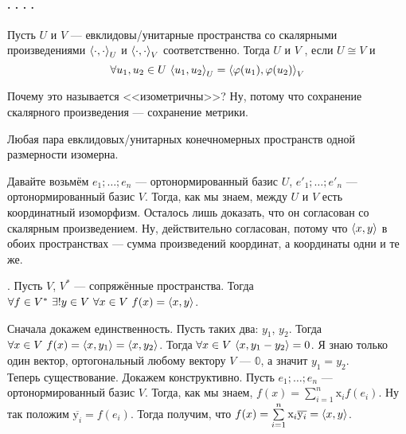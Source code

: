 \documentclass{article}
\begin{document}
    \paragraph{. . . .}
    \begin{itemize}
        \dfn Пусть $U$ и $V$ --- евклидовы/унитарные пространства со скалярными произведениями ${\left\langle{\cdot},{\cdot}\right\rangle}_U$ и ${\left\langle{\cdot},{\cdot}\right\rangle}_V$ соответственно. Тогда $U$ и $V$ , если $U\cong V$ и
        $$
        \forall u_1,u_2\in U~{\left\langle{u_1},{u_2}\right\rangle}_U={\left\langle{\varphi(u_1)},{\varphi(u_2)}\right\rangle}_V
        $$
        \begin{Comment}
            Почему это называется <<изометричны>>? Ну, потому что сохранение скалярного произведения --- сохранение метрики.
        \end{Comment}
        \thm Любая пара евклидовых/унитарных конечномерных пространств одной размерности изомерна.
        \begin{Proof}
            Давайте возьмём $e_1;\ldots;e_n$ --- ортонормированный базис $U$, $e'_1;\ldots;e'_n$ --- ортонормированный базис $V$. Тогда, как мы знаем, между $U$ и $V$ есть координатный изоморфизм. Осталось лишь доказать, что он согласован со скалярным произведением. Ну, действительно согласован, потому что ${\left\langle{x},{y}\right\rangle}$ в обоих пространствах --- сумма произведений координат, а координаты одни и те же.
        \end{Proof}
        \thm {}. Пусть $V$, $V^*$ --- сопряжённые пространства. Тогда $\forall f\in V^*~\exists!y\in V~\forall x\in V~f(x)={\left\langle{x},{y}\right\rangle}$.
        \begin{Proof}
            Сначала докажем единственность. Пусть таких два: $y_1$, $y_2$. Тогда $\forall x\in V~f(x)={\left\langle{x},{y_1}\right\rangle}={\left\langle{x},{y_2}\right\rangle}$. Тогда $\forall x\in V~{\left\langle{x},{y_1-y_2}\right\rangle}=0$. Я знаю только один вектор, ортогональный любому вектору $V$ --- $\mathbb0$, а значит $y_1=y_2$.\\
            Теперь существование. Докажем конструктивно. Пусть $e_1;\ldots;e_n$ --- ортонормированный базис $V$. Тогда, как мы знаем, $f(x)=\sum\limits_{i=1}^n\mathrm x_if(e_i)$. Ну так положим $\overline{\mathrm y_i}=f(e_i)$. Тогда получим, что $f(x)=\sum\limits_{i=1}^n\mathrm x_i\overline{\mathrm y_i}={\left\langle{x},{y}\right\rangle}$.
        \end{Proof}

\end{itemize}
\end{document}
